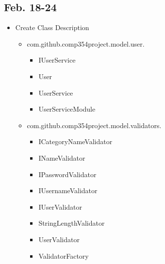 \documentclass[12pt]{article}
\begin{document}
\subsection*{Feb. 18-24}
\begin{itemize}
    \item Create Class Description
    \begin{itemize}
        \item com.github.comp354project.model.user.
        \begin{itemize}
            \item IUserService
            \item User
            \item UserService
            \item UserServiceModule
        \end{itemize}
        \item com.github.comp354project.model.validators.
        \begin{itemize}
            \item ICategoryNameValidator
            \item INameValidator
            \item IPasswordValidator
            \item IUsernameValidator
            \item IUserValidator
            \item StringLengthValidator
            \item UserValidator
            \item ValidatorFactory
        \end{itemize}
    \end{itemize}
\end{itemize}
\end{document}
